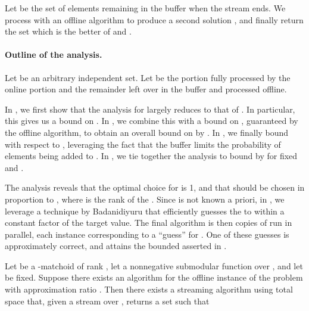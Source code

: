 \documentclass[oneside,letterpaper]{scrartcl} \usepackage{macros}
\begin{document}
Let  be the set of elements remaining in the buffer
 when the stream ends.  We process  with an
offline algorithm to produce a second solution , and finally
return the set  which is the better of  and .

\paragraph{Outline of the analysis.}

Let  be an arbitrary independent set. Let  be the portion fully processed by the online
portion and  the remainder left over in the
buffer and processed offline.

In , we first show that the
analysis for  largely reduces to that of
. In particular, this gives us a bound on
. In , we combine this
with a bound on , guaranteed by the offline algorithm, to
obtain an overall bound on  by . In
, we finally bound
 with respect to , leveraging the fact that the buffer
limits the probability of elements being added to . In
, we tie together the analysis to
bound  by  for fixed  and .

The analysis reveals that the optimal choice for  is 1, and
that  should be chosen in proportion to , where  is
the rank of the . Since  is not known a priori, in
, we leverage a technique by
Badanidiyuru \etal \cite{bmkk-sso-14} that efficiently guesses the
 to within a constant factor of the target value. The final
algorithm is then  copies of
 run in parallel, each instance
corresponding to a ``guess'' for . One of these guesses is
approximately correct, and attains the bounded asserted in
.


\begin{theorem}
  Let  be a -matchoid of
  rank , let  a nonnegative
  submodular function over , and let  be
  fixed. Suppose there exists an algorithm for the offline instance of
  the problem with approximation ratio . Then there exists a
  streaming algorithm using total space
   that, given a stream over , returns a set  such that
  
\end{theorem}
\end{document}
